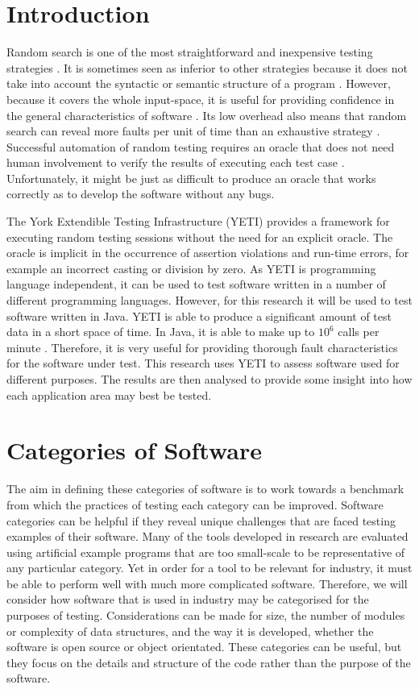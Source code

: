 \documentclass[runningheads,a4paper]{llncs}
\begin{document}
\section{Introduction}
Random search is one of the most straightforward and inexpensive testing strategies \cite{ince_1987}. It is sometimes seen as inferior to other strategies because it does not take into account  the syntactic or semantic structure of a program \cite{myers_2004}. However, because it covers the whole input-space, it is useful for providing confidence in the general characteristics of software \cite{hamlet_1994}. Its low overhead also means that random search can reveal more faults per unit of time than an exhaustive strategy \cite{mankefors_2003}. Successful automation of random testing requires an oracle that does not need human involvement to verify the results of executing each test case \cite{ince_1987}. Unfortunately, it might be just as difficult to produce an oracle that works correctly as to develop the software without any bugs.

The York Extendible Testing Infrastructure (YETI) provides a framework for executing random testing sessions without the need for an explicit oracle. The oracle is implicit in the occurrence of assertion violations and run-time errors, for example an incorrect casting or division by zero. As YETI is programming language independent, it can be used to test software written in a number of different programming languages. However, for this research it will be used to test software written in Java. YETI is able to produce a significant amount of test data in a short space of time. In Java, it is able to make up to $10^6$ calls per minute \cite{oriol_2010}. Therefore, it is very useful for providing thorough fault characteristics for the software under test. This research uses YETI to assess software used for different purposes. The results are then analysed to provide some insight into how each application area may best be tested.

\section{Categories of Software}
The aim in defining these categories of software is to work towards a benchmark from which the practices of testing each category can be improved. Software categories can be helpful if they reveal unique challenges that are faced testing examples of their software. Many of the tools developed in research are evaluated using artificial example programs that are too small-scale to be representative of any particular category. Yet in order for a tool to be relevant for industry, it must be able to perform well with much more complicated software. Therefore, we will consider how software that is used in industry may be categorised for the purposes of testing. Considerations can be made for size, the number of modules or complexity of data structures, and the way it is developed, whether the software is open source or object orientated. These categories can be useful, but they focus on the details and structure of the code rather than the purpose of the software. 
\end{document}
